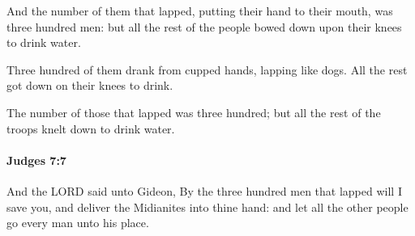 			\begin{versebox}
					\item[BHS] 
					\item[ASV] And the number of them that lapped, putting their hand to their mouth, was three hundred men: but all the rest of the people bowed down upon their knees to drink water.
					\item[NIV] Three hundred of them drank from cupped hands, lapping like dogs. All the rest got down on their knees to drink.
					\item[NRSV] The number of those that lapped was three hundred; but all the rest of the troops knelt down to drink water.
			\end{versebox}

		\paragraph{Judges 7:7} %
			\label{JUDGES-7-7}

			And the LORD said unto Gideon, By the three hundred men that lapped will I save you, and deliver the Midianites into thine hand: and let all the other people go every man unto his place.

